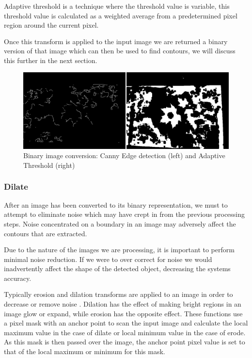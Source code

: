 Adaptive threshold is a technique where the threshold value is variable, this threshold value is calculated as a weighted average from a predetermined pixel region around the current pixel.

Once this transform is applied to the input image we are returned a binary version of that image which can then be used to find contours, we will discuss this further in the next section.

\begin{figure}[h!]
\centering
    \includegraphics[width=1.0\textwidth]{leaf_identification/images/convert_to_binary.png}
    \caption{Binary image conversion: Canny Edge detection (left) and Adaptive Threshold (right)}%
    \label{preprocessing}
\end{figure}


\subsubsection{Dilate}
After an image has been converted to its binary representation, we must to attempt to eliminate noise which may have crept in from the previous processing steps. Noise concentrated on a boundary in an image may adversely affect the contours that are extracted. 

Due to the nature of the images we are processing, it is important to perform minimal noise reduction. If we were to over correct for noise we would inadvertently affect the shape of the detected object, decreasing the systems accuracy.

Typically erosion and dilation transforms are applied to an image in order to decrease or remove noise \cite{bradski08}. Dilation has the effect of making bright regions in an image glow or expand, while erosion has the opposite effect. These functions use a pixel mask with an anchor point to scan the input image and calculate the local maximum value in the case of dilate or local minimum value in the case of erode. As this mask is then passed over the image, the anchor point pixel value is set to that of the local maximum or minimum for this mask.

